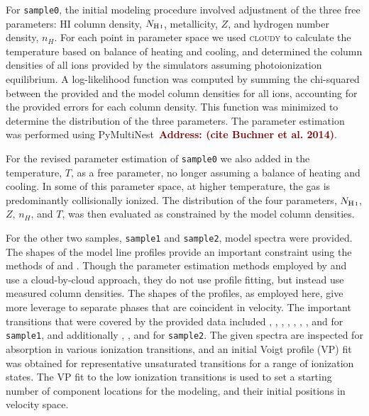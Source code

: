 \documentclass[fleqn,usenatbib]{mnras}
\newcommand{\todo}[1]{\textcolor{Maroon}{\textbf{Address: #1}}}
\begin{document}
For \texttt{sample0}, the initial modeling procedure involved adjustment of the three free parameters:
HI column density, $N_{\ion{H}{I}}$, metallicity, $Z$, and hydrogen number density, $n_H$.
For each point in parameter space we used \textsc{cloudy} to calculate the temperature based on balance of heating and cooling,
and determined the column densities of all ions provided by the simulators assuming photoionization equilibrium.
A log-likelihood function was computed by summing the chi-squared between the provided and the model column densities for all ions, accounting for the provided errors for each column density.
This function was minimized to determine the distribution of the three parameters.
The parameter estimation was performed using PyMultiNest~\todo{(cite Buchner et al. 2014)}. 

For the revised parameter estimation of \texttt{sample0} we also added in the temperature, $T$, as a free parameter, no longer assuming a balance of heating and cooling.
In some of this parameter space, at higher temperature, the gas is predominantly collisionally ionized.
The distribution of the four parameters, $N_{\ion{H}{I}}$, $Z$, $n_H$, and $T$, was then evaluated as constrained by the model column densities.

For the other two samples, \texttt{sample1} and \texttt{sample2}, model spectra were provided.
The shapes of the model line profiles provide an important constraint using the methods of \cite{Sameer2021} and \cite{Sameer2022}.
Though the  parameter estimation methods employed by \cite{Zahedy2019} and \cite{Haislmaier2021} use a cloud-by-cloud approach, they do not use profile fitting, but instead use measured column densities.
The shapes of the profiles, as employed here, give more leverage to separate phases that are coincident in velocity.
The important transitions that were covered by the provided  data included , , , , , , , and  for \texttt{sample1}, and additionally , , and  for \texttt{sample2}.
The given spectra are inspected for absorption in various ionization transitions, and an initial Voigt profile (VP) fit was obtained for representative unsaturated transitions for a range of ionization states.
The VP fit to the low ionization transitions is used to set a starting number of component locations for the modeling, and their initial positions in velocity space.
\end{document}
